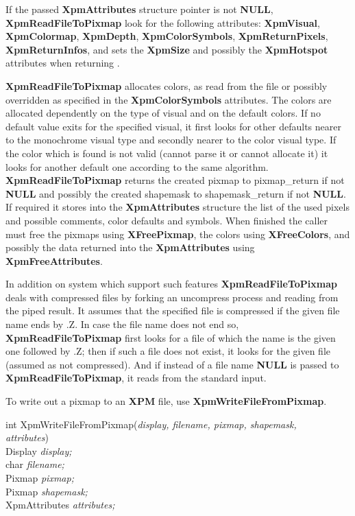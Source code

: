 If the passed {\bf XpmAttributes} structure pointer is not {\bf NULL}, {\bf
XpmReadFileToPixmap} look for the following attributes: {\bf XpmVisual}, {\bf
XpmColormap}, {\bf XpmDepth}, {\bf XpmColorSymbols}, {\bf XpmReturnPixels},
{\bf XpmReturnInfos}, and sets the {\bf XpmSize} and possibly the {\bf
XpmHotspot} attributes when returning .

{\bf XpmReadFileToPixmap} allocates colors, as read from the file or possibly
overridden as specified in the {\bf XpmColorSymbols} attributes. The colors
are allocated dependently on the type of visual and on the default colors. If
no default value exits for the specified visual, it first looks for other
defaults nearer to the monochrome visual type and secondly nearer to the color
visual type. If the color which is found is not valid (cannot parse it or
cannot allocate it) it looks for another default one according to the same
algorithm. {\bf XpmReadFileToPixmap} returns the created pixmap to
pixmap\_return if not {\bf NULL} and possibly the created shapemask to
shapemask\_return if not {\bf NULL}. If required it stores into the {\bf
XpmAttributes} structure the list of the used pixels and possible comments,
color defaults and symbols. When finished the caller must free the pixmaps
using {\bf XFreePixmap}, the colors using {\bf XFreeColors}, and possibly the
data returned into the {\bf XpmAttributes} using {\bf XpmFreeAttributes}.

In addition on system which support such features {\bf XpmReadFileToPixmap}
deals with compressed files by forking an uncompress process and reading from
the piped result. It assumes that the specified file is compressed if the
given file name ends by .Z. In case the file name does not end so, {\bf
XpmReadFileToPixmap} first looks for a file of which the name is the given one
followed by .Z; then if such a file does not exist, it looks for the given
file (assumed as not compressed). And if instead of a file name {\bf NULL} is
passed to {\bf XpmReadFileToPixmap}, it reads from the standard input.

\vspace{.5cm}
To write out a pixmap to an {\bf XPM} file, use {\bf XpmWriteFileFromPixmap}.

\begin{flushleft} 

int XpmWriteFileFromPixmap({\it display, filename, pixmap, shapemask,\\
\hspace{3cm}attributes})\\

\hspace{1cm}Display {\it *display;}\\
\hspace{1cm}char {\it *filename;}\\
\hspace{1cm}Pixmap {\it pixmap;}\\
\hspace{1cm}Pixmap {\it shapemask;}\\
\hspace{1cm}XpmAttributes {\it *attributes;}

\end{flushleft}


